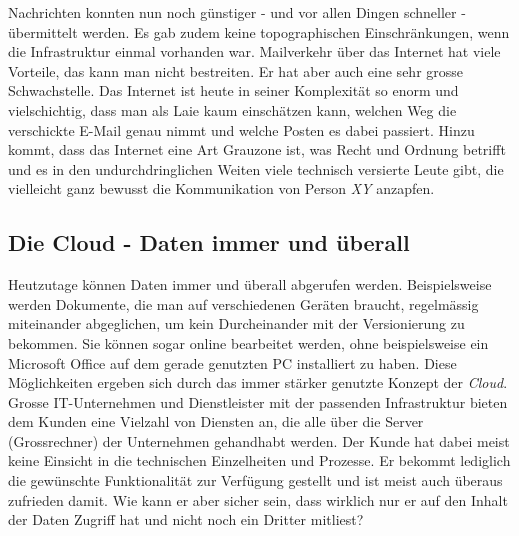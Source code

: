 Nachrichten konnten nun noch günstiger - und vor allen Dingen schneller - übermittelt werden. Es gab zudem keine topographischen Einschränkungen, wenn die Infrastruktur einmal vorhanden war. Mailverkehr über das Internet hat viele Vorteile, das kann man nicht bestreiten. Er hat aber auch eine sehr grosse Schwachstelle. Das Internet ist heute in seiner Komplexität so enorm und vielschichtig, dass man als Laie kaum einschätzen kann, welchen Weg die verschickte E-Mail genau nimmt und welche Posten es dabei passiert. Hinzu kommt, dass das Internet eine Art Grauzone ist, was Recht und Ordnung betrifft und es in den undurchdringlichen Weiten viele technisch versierte Leute gibt, die vielleicht ganz bewusst die Kommunikation von Person \textit{XY} anzapfen.

\subsection{Die Cloud - Daten immer und überall}
Heutzutage können Daten immer und überall abgerufen werden. Beispielsweise werden Dokumente, die man auf verschiedenen Geräten braucht, regelmässig miteinander abgeglichen, um kein Durcheinander mit der Versionierung zu bekommen. Sie können sogar online bearbeitet werden, ohne beispielsweise ein Microsoft Office auf dem gerade genutzten PC installiert zu haben. Diese Möglichkeiten ergeben sich durch das immer stärker genutzte Konzept der \textit{Cloud}. Grosse IT-Unternehmen und Dienstleister mit der passenden Infrastruktur bieten dem Kunden eine Vielzahl von Diensten an, die alle über die Server (Grossrechner) der Unternehmen gehandhabt werden. Der Kunde hat dabei meist keine Einsicht in die technischen Einzelheiten und Prozesse. Er bekommt lediglich die gewünschte Funktionalität zur Verfügung gestellt und ist meist auch überaus zufrieden damit. Wie kann er aber sicher sein, dass wirklich nur er auf den Inhalt der Daten Zugriff hat und nicht noch ein Dritter mitliest?

